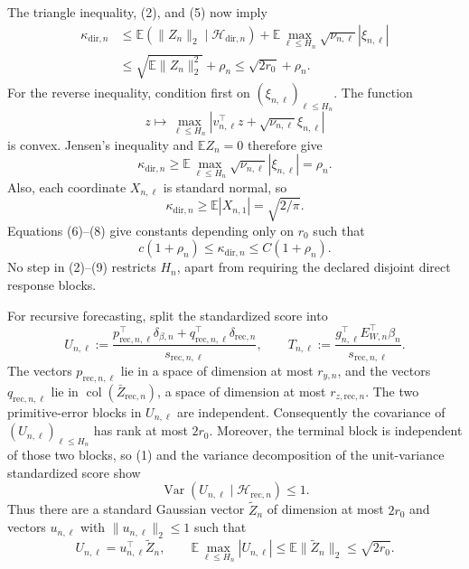 The triangle inequality, (2), and (5) now imply
\[
\begin{aligned}
 \kappa_{\mathrm{dir},n}
 &\le \mathbb E(\|Z_n\|_2\mid\mathcal H_{\mathrm{dir},n})
 +\mathbb E\max_{\ell\le H_n}
       \sqrt{\nu_{n,\ell}}|\xi_{n,\ell}|\\
 &\le \sqrt{\mathbb E\|Z_n\|_2^2}+\rho_n
 \le\sqrt{2r_0}+\rho_n.
 \tag{6}
\end{aligned}
\]
For the reverse inequality, condition first on \((\xi_{n,\ell})_{\ell\le H_n}\).  The function
\[
 z\longmapsto\max_{\ell\le H_n}
 \left|v_{n,\ell}^{\top}z+\sqrt{\nu_{n,\ell}}\xi_{n,\ell}\right|
\]
is convex.  Jensen's inequality and \(\mathbb E Z_n=0\) therefore give
\[
 \kappa_{\mathrm{dir},n}\ge
 \mathbb E\max_{\ell\le H_n}
 \sqrt{\nu_{n,\ell}}|\xi_{n,\ell}|=\rho_n.
 \tag{7}
\]
Also, each coordinate \(X_{n,\ell}\) is standard normal, so
\[
 \kappa_{\mathrm{dir},n}\ge
 \mathbb E|X_{n,1}|=\sqrt{2/\pi}.
 \tag{8}
\]
Equations (6)--(8) give constants depending only on \(r_0\) such that
\[
 c(1+\rho_n)\le\kappa_{\mathrm{dir},n}
 \le C(1+\rho_n).
 \tag{9}
\]
No step in (2)--(9) restricts \(H_n\), apart from requiring the declared disjoint direct response blocks.

For recursive forecasting, split the standardized score into
\[
 U_{n,\ell}:=\frac{p_{\mathrm{rec},n,\ell}^{\top}\delta_{\beta,n}
 +q_{\mathrm{rec},n,\ell}^{\top}\delta_{\mathrm{rec},n}}
 {s_{\mathrm{rec},n,\ell}},
 \qquad
 T_{n,\ell}:=\frac{g_{n,\ell}^{\top}E_{W,n}^{\top}\beta_n}
 {s_{\mathrm{rec},n,\ell}}.
 \tag{10}
\]
The vectors \(p_{\mathrm{rec},n,\ell}\) lie in a space of dimension at most \(r_{y,n}\), and the vectors \(q_{\mathrm{rec},n,\ell}\) lie in \(\operatorname{col}(\bar Z_{\mathrm{rec},n})\), a space of dimension at most \(r_{z,\mathrm{rec},n}\).  The two primitive-error blocks in \(U_{n,\ell}\) are independent.  Consequently the covariance of \((U_{n,\ell})_{\ell\le H_n}\) has rank at most \(2r_0\).  Moreover, the terminal block is independent of those two blocks, so (1) and the variance decomposition of the unit-variance standardized score show
\[
 \operatorname{Var}(U_{n,\ell}\mid\mathcal H_{\mathrm{rec},n})\le1.
\]
Thus there are a standard Gaussian vector \(\widetilde Z_n\) of dimension at most \(2r_0\) and vectors \(u_{n,\ell}\) with \(\|u_{n,\ell}\|_2\le1\) such that
\[
 U_{n,\ell}=u_{n,\ell}^{\top}\widetilde Z_n,
 \qquad
 \mathbb E\max_{\ell\le H_n}|U_{n,\ell}|
 \le\mathbb E\|\widetilde Z_n\|_2\le\sqrt{2r_0}.
 \tag{11}
\]

